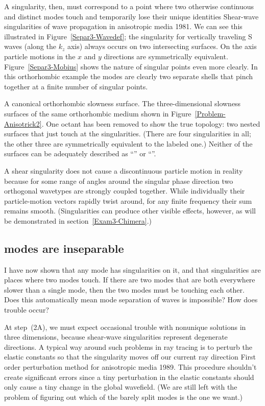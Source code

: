 A singularity, then, must correspond to a point where two
otherwise continuous and distinct modes touch and temporarily
lose their unique identities
{Shear-wave singularities of wave propagation in anisotropic media}
{1981}.
\label{Separ3-Touch}
We can see this illustrated in Figure~\ref{Separ3-Wavedef};
the singularity for vertically traveling S waves (along the $k_z$ axis)
always occurs on two intersecting surfaces. On the axis particle
motions in the $x$ and $y$ directions are symmetrically equivalent.
Figure~\ref{Separ3-Mobius} shows the nature of singular points
even more clearly.
In this orthorhombic example the {\qS} modes are clearly
two separate shells that pinch together at a finite number
of singular points.

{A canonical orthorhombic slowness surface.}
{
The three-dimensional slowness surfaces
of the same orthorhombic medium shown
in Figure~\protect\ref{Problem-Anisotrick2}.
One octant has been removed to show the true topology:
two nested {\qS} surfaces that just touch at the singularities.
(There are four singularities in all; the other three are symmetrically
equivalent to the labeled one.)
Neither of the surfaces can be adequately
described as ``{\qSV}'' or ``{\qSH}''.
}

A shear singularity does not cause a discontinuous particle motion
in reality because for some range of angles around the
singular phase direction two orthogonal wavetypes
are strongly coupled together.
While individually their particle-motion vectors rapidly twist around,
for any finite frequency their sum remains smooth.
(Singularities can produce other visible effects, however, as
will be demonstrated in section~\ref{Exam3-Chimera}.)

\subsection{{\qS} modes are inseparable}
I have now shown that any {\qS} mode has singularities on it,
and that singularities are places where two modes touch.
If there are two {\qS} modes that are both everywhere slower
than a single {\qP} mode, then the two {\qS} modes must be
touching each other.
Does this automatically mean mode separation of
{\qS} waves is impossible? How does trouble occur?

At step~(2A),
we must expect occasional trouble with nonunique {\qS} solutions
in three dimensions,
because shear-wave singularities represent
degenerate directions.
A typical way around such problems in ray tracing is to perturb
the elastic constants so that the singularity moves off
our current ray direction
{First order perturbation method for anisotropic media}
{1989}.
This procedure shouldn't create significant errors since
a tiny perturbation in the elastic constants should only cause a
tiny change in the global wavefield.
(We are still left with the problem of figuring out which
of the barely split modes is the one we want.)

